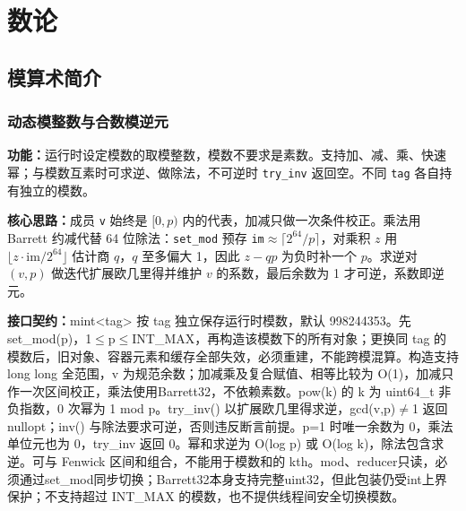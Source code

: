 \newpage

\chapter{数论}

\section{模算术简介}

\subsection{动态模整数与合数模逆元}\label{compact-mint}

\noindent\textbf{功能：}\allowbreak 运行时设定模数的取模整数，模数不要求是素数。支持加、减、乘、快速幂；与模数互素时可求逆、做除法，不可逆时 \texttt{try\_inv} 返回空。不同 \texttt{tag} 各自持有独立的模数。

\textbf{核心思路：}\allowbreak 成员 \texttt{v} 始终是 $[0,p)$ 内的代表，加减只做一次条件校正。乘法用 Barrett 约减代替 64 位除法：\texttt{set\_mod} 预存 \texttt{im}$\approx\lceil2^{64}/p\rceil$，对乘积 $z$ 用 $\lfloor z\cdot\mathrm{im}/2^{64}\rfloor$ 估计商 $q$，$q$ 至多偏大 1，因此 $z-qp$ 为负时补一个 $p$。求逆对 $(v,p)$ 做迭代扩展欧几里得并维护 $v$ 的系数，最后余数为 1 才可逆，系数即逆元。



{\sloppy{}\noindent\textbf{接口契约：}mint<tag> 按 tag 独立保存运行时模数，默认 998244353。先 set\_mod(p)，1$\le$p$\le$INT\_MAX，再构造该模数下的所有对象；更换同 tag 的模数后，旧对象、容器元素和缓存全部失效，必须重建，不能跨模混算。构造支持 long long 全范围，v 为规范余数；加减乘及复合赋值、相等比较为 O(1)，加减只作一次区间校正，乘法使用Barrett32，不依赖素数。pow(k) 的 k 为 uint64\_t 非负指数，0 次幂为 1 mod p。try\_inv() 以扩展欧几里得求逆，gcd(v,p)$\ne$1 返回 nullopt；inv() 与除法要求可逆，否则违反断言前提。p=1 时唯一余数为 0，乘法单位元也为 0，try\_inv 返回 0。幂和求逆为 O(log p) 或 O(log k)，除法包含求逆。可与 Fenwick 区间和组合，不能用于模数和的 kth。mod、reducer只读，必须通过set\_mod同步切换；Barrett32本身支持完整uint32，但此包装仍受int上界保护；不支持超过 INT\_MAX 的模数，也不提供线程间安全切换模数。\par}

\Needspace{387pt}



\newpage

